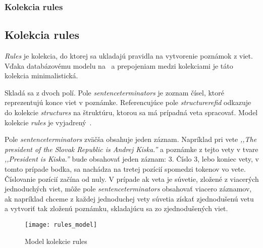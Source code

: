 %
%
{
	\subsubsection{Kolekcia rules}
}
{
	\subsection{Kolekcia rules}
}
\label{subsubsection:collection_rules}
\textit{Rules} je kolekcia, do ktorej sa ukladajú pravidla na vytvorenie poznámok z viet. Vďaka databázovému modelu na~ a prepojeniam medzi kolekciami je táto kolekcia minimalistická.

Skladá sa z dvoch polí. Pole \textit{sentence\textunderscore terminators} je zoznam čísel, ktoré reprezentujú konce viet v poznámke. Referencujúce pole \textit{structure\textunderscore ref\textunderscore id} odkazuje do kolekcie \textit{structures} na štruktúru, ktorou sa má prípadná veta spracovať. Model kolekcie \textit{rules} je vyjadrený~.

Pole \textit{sentence\textunderscore terminators} zväčša obsahuje jeden záznam. Napríklad pri vete \textit{,,The president of the Slovak Republic is Andrej Kiska.''} a poznámke z tejto vety v tvare \textit{,,President is Kiska.''} bude obsahovať jeden záznam: 3. Číslo 3, lebo koniec vety, v tomto prípade bodka, sa nachádza na tretej pozícií spomedzi tokenov vo vete. Číslovanie pozícií začína od nuly. V prípade ak veta je súvetie, zložené z viacerých jednoduchých viet, môže pole \textit{sentence\textunderscore terminators} obsahovať viacero záznamov, ak napríklad chceme z každej jednoduchej vety súvetia získať zjednodušenú vetu a vytvoriť tak zloženú poznámku, skladajúcu sa zo zjednodušených viet.

\begin{figure}[H]
	\begin{center}\texttt{[image: rules\_model]}\end{center}
	\caption[Model kolekcie rules]{Model kolekcie rules}\label{fig:rules_collection_model}
\end{figure}

